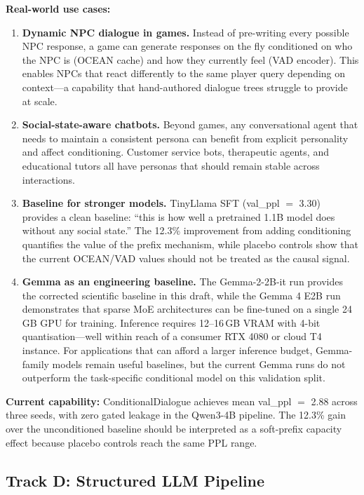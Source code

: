 \documentclass[11pt]{article}
\begin{document}
\textbf{Real-world use cases:}
\begin{enumerate}
    \item \textbf{Dynamic NPC dialogue in games.} Instead of pre-writing every possible NPC response, a game can generate responses on the fly conditioned on who the NPC is (OCEAN cache) and how they currently feel (VAD encoder).
    This enables NPCs that react differently to the same player query depending on context---a capability that hand-authored dialogue trees struggle to provide at scale.
    \item \textbf{Social-state-aware chatbots.} Beyond games, any conversational agent that needs to maintain a consistent persona can benefit from explicit personality and affect conditioning.
    Customer service bots, therapeutic agents, and educational tutors all have personas that should remain stable across interactions.
    \item \textbf{Baseline for stronger models.} TinyLlama SFT (val\_ppl $=$ 3.30) provides a clean baseline: ``this is how well a pretrained 1.1B model does without any social state.''
    The 12.3\% improvement from adding conditioning quantifies the value of the prefix mechanism, while placebo controls show that the current OCEAN/VAD values should not be treated as the causal signal.
    \item \textbf{Gemma as an engineering baseline.} The Gemma-2-2B-it run provides the corrected scientific baseline in this draft, while the Gemma 4 E2B run demonstrates that sparse MoE architectures can be fine-tuned on a single 24\,GB GPU for training.
    Inference requires 12--16\,GB VRAM with 4-bit quantisation---well within reach of a consumer RTX 4080 or cloud T4 instance.
    For applications that can afford a larger inference budget, Gemma-family models remain useful baselines, but the current Gemma runs do not outperform the task-specific conditional model on this validation split.
\end{enumerate}

\textbf{Current capability:} ConditionalDialogue achieves mean val\_ppl $=$ 2.88 across three seeds, with zero gated leakage in the Qwen3-4B pipeline.
The 12.3\% gain over the unconditioned baseline should be interpreted as a soft-prefix capacity effect because placebo controls reach the same PPL range.

\subsection{Track D: Structured LLM Pipeline}
\end{document}
